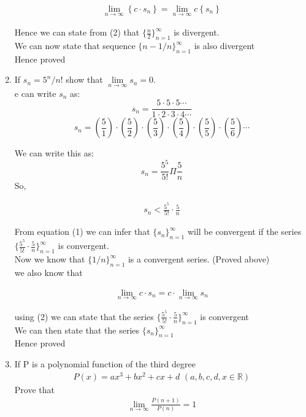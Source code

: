 \documentclass[11pt, letterpaper]{article}
\begin{document}
\begin{enumerate}
{		\begin{eqnarray}
			\lim \limits_{n \to \infty} \left\lbrace c \cdot s_n \right\rbrace = \lim \limits_{n \to \infty} c \left\lbrace s_n \right\rbrace 
		\end{eqnarray}
		
		Hence we can state from (2) that $ \lbrace \frac{n}{2} \rbrace_{n=1}^\infty $ is divergent.\\
		We can now state that sequence $ \lbrace n - 1/n \rbrace_{n=1}^\infty $ is also divergent\\
		Hence proved
	}
	
	\item{If $s_n = 5^n/n!$ show that $\lim \limits_{n \to \infty} s_n = 0$.\\
	e can write $s_n$ as:\\
	$$s_n = \frac{5 \cdot 5 \cdot 5 \cdots}{1 \cdot 2 \cdot 3 \cdot 4 \cdots}$$
	$$s_n = \left( \frac{5}{1} \right) \cdot \left( \frac{5}{2} \right) \cdot \left(\frac{5}{3} \right) \cdot \left( \frac{5}{4} \right) \cdot \left( \frac{5}{5} \right) \cdot \left( \frac{5}{6} \right) \cdots$$
	
	We can write this as:\\
	$$s_n = \frac{5^5}{5!} \Pi\frac{5}{n}$$
	So, 
	
	\setcounter{equation}{0}
	
	\begin{eqnarray}
		s_n < \frac{5^5}{5!} \cdot \frac{5}{n}
	\end{eqnarray}		
	
	From equation (1) we can infer that $ \lbrace s_n \rbrace_{n=1}^\infty $ will be convergent if the series $ \lbrace \frac{5^5}{5!} \cdot \frac{5}{n} \rbrace_{n=1}^\infty $ is convergent.\\
	Now we know that $ \lbrace 1/n \rbrace_{n=1}^\infty $ is a convergent series. (Proved above)\\
	we also know that 
	
	\begin{eqnarray}
		\lim \limits_{n \to \infty} c \cdot s_n = c \cdot \lim \limits_{n \to \infty} s_n
	\end{eqnarray}
	
	using (2) we can state that the series $ \lbrace \frac{5^5}{5!} \cdot \frac{5}{n} \rbrace_{n=1}^\infty $ is convergent \\
	We can then state that the series $ \lbrace s_n \rbrace_{n=1}^\infty $ \\
	Hence proved
	}
	
	\item{If P is a polynomial function of the third degree
		\begin{align*}
			P(x) = ax^3 + bx^2 + cx + d \,\, (a, b, c, d, x \in \mathbb{R})
		\end{align*}	
		Prove that
		\begin{align*}
			\lim \limits_{n \to \infty} \frac{P(n+1)}{P(n)} = 1
		\end{align*}
		
}
\end{enumerate}
\end{document}
